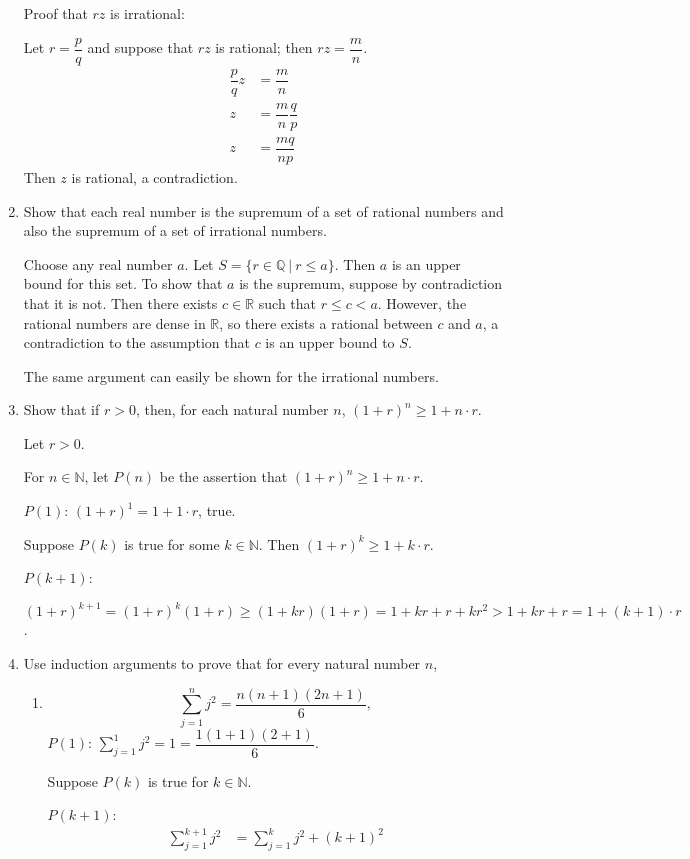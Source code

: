 \documentclass[a4paper,10pt]{book}
\theoremstyle{plain} %
\begin{document}
\begin{enumerate}
	Proof that $rz$ is irrational:\par
	Let $r = \dfrac{p}{q}$ and suppose that $rz$ is rational; then $rz = \dfrac{m}{n}$.
	\begin{align*}
		\dfrac{p}{q}z &= \dfrac{m}{n}\\
		z &=\dfrac{m}{n} \dfrac{q}{p}\\
		z &= \dfrac{mq}{np}
	\end{align*}
	Then $z$ is rational, a contradiction.
	\item Show that each real number is the supremum of a set of rational numbers and also the supremum of a set of irrational numbers.\par
	Choose any real number $a$. Let $S=\{ r \in \mathbb{Q}\ |\ r\le a\}$.
	Then $a$ is an upper bound for this set. To show that $a$ is the supremum, suppose by contradiction that it is not.
	Then there exists $c \in \mathbb{R}$ such that $r \le c < a$. 
	However, the rational numbers are dense in $\mathbb{R}$, so there exists a rational between $c$ and $a$, a contradiction to the assumption that $c$ is an upper bound to $S$. 
	\par
	The same argument can easily be shown for the irrational numbers.
	\item Show that if $r>0$, then, for each natural number $n$, $(1+r)^n \ge 1+n \cdot r$.\par
	Let $r>0$.\par
	For $n \in \mathbb{N}$, let $P(n)$ be the assertion that $(1+r)^n \ge 1+n \cdot r$.\par
	$P(1)$: $(1+r)^1 = 1+1 \cdot r$, true.\par
	Suppose $P(k)$ is true for some $k \in \mathbb{N}$. Then $(1+r)^k \ge 1+k \cdot r$. \par
	$P(k+1)$:\par
	$(1+r)^{k+1} = (1+r)^k(1+r) \ge (1+kr)(1+r) = 1+ kr + r +kr^2 > 1+ kr + r = 1+(k+1) \cdot r$.
	\item Use induction arguments to prove that for every natural number $n$,
	\begin{enumerate}[label=(\roman*),align=left]
        \item \[ \sum_{j=1}^n j^2 = \dfrac{n(n+1)(2n+1)}{6}, \]
        $P(1)$: $\sum_{j=1}^1 j^2 = 1 = \dfrac{1(1+1)(2+1)}{6}$.\par
		Suppose $P(k)$ is true for $k \in \mathbb{N}$.\par
		$P(k+1)$: 
		\begin{align*}
			\sum_{j=1}^{k+1} j^2 &= \sum_{j=1}^{k} j^2 + (k+1)^2 \\

\end{align*}
\end{enumerate}
\end{enumerate}
\end{document}
